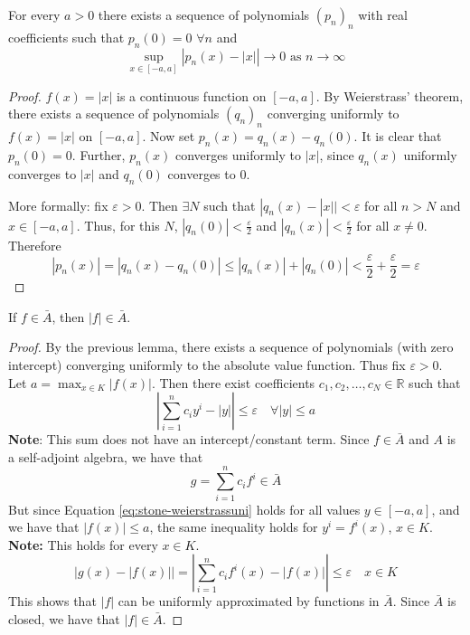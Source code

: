 \documentclass[11pt]{article}
\numberwithin{equation}{section}
\theoremstyle{definition}
\theoremstyle{definition}
\newcommand\abs[1]{\left| #1 \right|}
\newcommand{\1}{\mathbbm 1}
\newcommand{\e}{\varepsilon}
\newcommand{\RR}{\mathbb R}
\begin{document}
\begin{lemma}
	For every $a > 0$ there exists a sequence of polynomials $(p_n)_n$ with real coefficients such that $p_n(0) = 0$ $\forall n$ and
	\begin{equation}
		\sup_{x \in [-a,a]}\abs{p_n(x) - \abs{x}} \to 0 \text{ as } n \to \infty
	\end{equation}
\end{lemma}
\begin{proof}
	$f(x) = \abs{x}$ is a continuous function on $[-a,a]$. By Weierstrass' theorem, there exists a sequence of polynomials $(q_n)_n$ converging uniformly to $f(x) = \abs{x}$ on $[-a,a]$. Now set $p_n(x) = q_n(x) - q_n(0)$. It is clear that $p_n(0) = 0$. Further, $p_n(x)$ converges uniformly to $|x|$, since $q_n(x)$ uniformly converges to $|x|$ and $q_n(0)$ converges to 0. 

	More formally: fix $\e > 0$. Then $\exists N$ such that $|q_n(x) - |x|| < \e$ for all $n>N$ and $x \in [-a,a]$. Thus, for this $N$, $|q_n(0)|< \frac{\e}{2}$ and $|q_n(x)| < \frac{\e}{2}$ for all $x \neq 0$. Therefore
	\begin{equation}
		|p_n(x)| = |q_n(x) - q_n(0)| \leq |q_n(x)| + |q_n(0)| < \frac{\e}{2} + \frac{\e}{2} = \e
	\end{equation}
\end{proof}

\begin{lemma}[]
	If $f \in \bar{A}$, then $|f| \in \bar{A}$.
\end{lemma}
\begin{proof}
	By the previous lemma, there exists a sequence of polynomials (with zero intercept) converging uniformly to the absolute value function. Thus fix $\e > 0$. Let $a = \max_{x \in K} |f(x)|$. Then there exist coefficients $c_1,c_2,\ldots,c_N \in \RR$ such that
	\begin{equation}\label{eq:stone-weierstrassuni}
		\abs{\sum_{i=1}^n c_i y^i - \abs{y}} \leq \e \quad \forall \abs{y} \leq a
	\end{equation}
	\textbf{Note}: This sum does not have an intercept/constant term. Since $f \in \bar{A}$ and $A$ is a self-adjoint algebra, we have that
	\begin{equation}
		g = \sum_{i=1}^n c_i f^i \in \bar{A}
	\end{equation}
	But since Equation \ref{eq:stone-weierstrassuni} holds for all values $ y \in [-a,a]$, and we have that $\abs{f(x)} \leq a$, the same inequality holds for $y^i = f^i(x)$, $x \in K$. \textbf{Note:} This holds for every $x \in K$.
	\begin{equation}
		\abs{g(x) - \abs{f(x)}} = \abs{\sum_{i=1}^n c_i f^i(x) - \abs{f(x)}} \leq \e \quad x \in K
	\end{equation}
	This shows that $|f|$ can be uniformly approximated by functions in $\bar{A}$. Since $\bar{A}$ is closed, we have that $|f| \in \bar{A}$. 
\end{proof}
\end{document}
